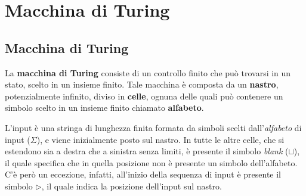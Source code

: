 \chapter{Macchina di Turing}
\section{Macchina di Turing}
La \textbf{macchina di Turing} consiste di un controllo finito che può trovarsi
in un stato, scelto in un insieme finito. Tale macchina è composta da un
\textbf{nastro}, potenzialmente infinito, diviso in \textbf{celle}, ognuna delle
quali può contenere un simbolo scelto in un insieme finito chiamato
\textbf{alfabeto}.

L'input è una stringa di lunghezza finita formata da simboli scelti
dall'\textit{alfabeto} di input ($\Sigma$), e viene inizialmente posto sul nastro.
In tutte le altre celle, che si estendono sia a destra che a sinistra senza limiti,
è presente il simbolo \textit{blank} ($\sqcup$), il quale specifica che in quella
posizione non è presente un simbolo dell'alfabeto. C'è però un eccezione, infatti,
all'inizio della sequenza di input è presente il simbolo $\triangleright$, il
quale indica la posizione dell'input sul nastro.
